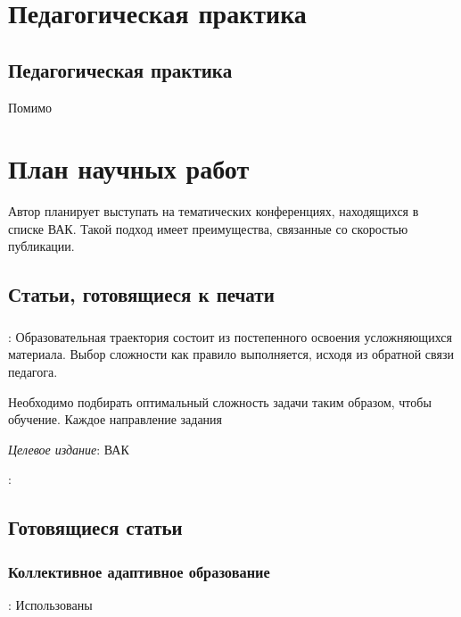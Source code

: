 \section{Педагогическая практика}

\subsection{Педагогическая практика}

Помимо




\section{План научных работ}

Автор планирует выступать на тематических конференциях, находящихся в списке ВАК.
Такой подход имеет преимущества, связанные со скоростью публикации.

\subsection{Статьи, готовящиеся к печати}

\subsubsection{}

: Образовательная траектория состоит из постепенного освоения усложняющихся материала. Выбор
сложности как правило выполняется, исходя из обратной связи педагога. 




Необходимо подбирать оптимальный сложность задачи таким образом, чтобы обучение. Каждое направление задания


\texit{}

\textit{Целевое издание}: ВАК

: 




\subsection{Готовящиеся статьи}

\subsubsection{Коллективное адаптивное образование}

\texit{}





: Использованы

